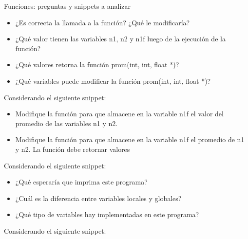 \documentclass[xcolor=pdftex,table,11pt]{beamer}
\begin{document}
\begin{frame}[allowframebreaks]{Funciones: preguntas y snippets a analizar}
\begin{itemize}

\item ¿Es correcta la llamada a la función? ¿Qué le modificaría?
\item ¿Qué valor tienen las variables n1, n2 y n1f luego de la ejecución de la función?

\item ¿Qué valores retorna la función prom(int, int, float *)?

\item ¿Qué variables puede modificar la función prom(int, int, float *)?


\end{itemize}

\newpage
Considerando el siguiente snippet:

\codesetstylefrombeamer
{}


\begin{itemize}

\item Modifique la función para que almacene en la variable n1f el valor del promedio de las variables n1 y n2.

\item Modifique la función para que almacene en la variable n1f el promedio de n1 y n2. La función debe retornar valores
\end{itemize}
 


\newpage
Considerando el siguiente snippet:

\codesetstylefrombeamer
{}


\begin{itemize}

\item ¿Qué esperaría que imprima este programa?

\item ¿Cuál es la diferencia entre variables locales y globales?

\item ¿Qué tipo de variables hay implementadas en este programa?

\end{itemize}

\newpage
Considerando el siguiente snippet:

\codesetstylefrombeamer
{}


\begin{itemize}


\end{itemize}
\end{frame}
\end{document}

